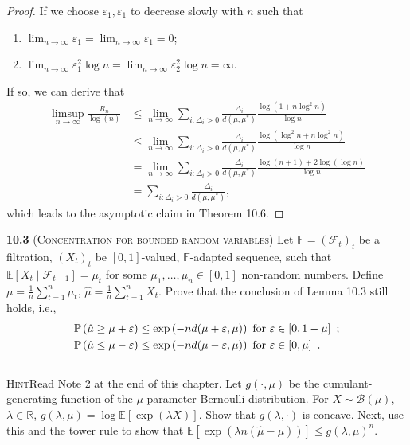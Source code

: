 \begin{proof}
    If we choose $\varepsilon_{1}, \varepsilon_{1}$ to decrease slowly with $n$ such that
    
    \begin{enumerate}
        \item $\lim_{n \to \infty} \varepsilon_{1} = \lim_{n \to \infty} \varepsilon_{1} = 0$;
        \item $\lim_{n \to \infty} \varepsilon_{1}^2 \log n = \lim_{n \to \infty} \varepsilon_{2}^2 \log n = \infty$.
    \end{enumerate}

    If so, we can derive that
    \begin{equation*}
        \begin{aligned}
            \limsup _{n \to \infty} \frac{R_{n}}{\log (n)}
            &\leq \lim _{n \to \infty} \sum_{i: \Delta_i > 0} \frac{\Delta_i}{d(\mu, \mu^*)} \frac{\log(1+n\log^2 n)}{\log n}\\
            &\leq \lim _{n \to \infty} \sum_{i: \Delta_i > 0} \frac{\Delta_i}{d(\mu, \mu^*)} \frac{\log(\log^2 n+n\log^2 n)}{\log n}\\
            &= \lim _{n \to \infty} \sum_{i: \Delta_i > 0} \frac{\Delta_i}{d(\mu, \mu^*)} \frac{\log(n+1) + 2\log(\log n)}{\log n}\\
            &= \sum_{i: \Delta_i > 0} \frac{\Delta_i}{d(\mu, \mu^*)},
        \end{aligned}
    \end{equation*}
    which leads to the asymptotic claim in Theorem 10.6.
\end{proof}

\noindent\textbf{10.3} (\textsc{Concentration for bounded random variables}) Let $\mathbb{F}=\left(\mathcal{F}_{t}\right)_{t}$ be a filtration,
$\left(X_{t}\right)_{t}$ be $[0,1]$-valued, $\mathbb{F}$-adapted sequence,
such that $\mathbb{E}\left[X_{t} \mid \mathcal{F}_{t-1}\right]=\mu_{t}$ for some $\mu_{1}, \ldots, \mu_{n} \in[0,1]$ non-random numbers.
Define $\mu=\frac{1}{n} \sum_{t=1}^{n} \mu_{t}$, $\hat{\mu}=\frac{1}{n} \sum_{t=1}^{n} X_{t}$.
Prove that the conclusion of Lemma 10.3 still holds, i.e., 
\begin{align*}
   & \mathbb{P} \left( \hat{\mu}\ge \mu+ \varepsilon\right) \le \exp\left(-nd(\mu+\varepsilon,\mu)\right) \text{ for $\varepsilon\in[0,1-\mu]$ } \,; \\
    &\mathbb{P} \left(\hat{\mu}\le \mu- \varepsilon\right) \le \exp\left(-nd(\mu-\varepsilon,\mu)\right) \text{ for $\varepsilon\in[0,\mu]$ } \,. 
\end{align*}
~\\
\noindent\textsc{Hint}\quad Read Note 2 at the end of this chapter.
Let $g(\cdot, \mu)$ be the cumulant-generating function of the $\mu$-parameter Bernoulli distribution.
For $X \sim \mathcal{B}(\mu)$, $\lambda \in \mathbb{R}$, $g(\lambda, \mu)=\log \mathbb{E}[\exp (\lambda X)]$.
Show that $g(\lambda, \cdot)$ is concave.
Next, use this and the tower rule to show that $\mathbb{E}[\exp (\lambda n(\hat{\mu}-\mu))] \leq g(\lambda, \mu)^{n}$.

